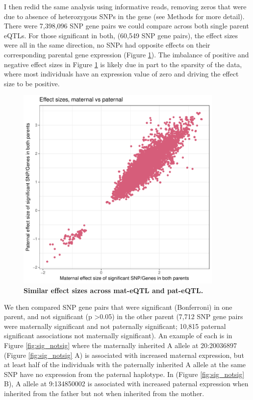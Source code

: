 I then redid the same analysis using informative reads, removing zeros that were due to absence of heterozygous SNPs in the gene (see Methods for more detail). There were 7,398,096 SNP gene pairs we could compare across both single parent eQTLs. For those significant in both, (60,549 SNP gene pairs), the effect sizes were all in the same direction, no SNPs had opposite effects on their corresponding parental gene expression (Figure \ref{fig:effectsizes}). The imbalance of positive and negative effect sizes in Figure \ref{fig:effectsizes} is likely due in part to the sparsity of the data, where most individuals have an expression value of zero and driving the effect size to be positive.

\begin{figure}[!htb]
\centering \includegraphics[width=4in]{img/ch04/fig-06-effectsizes.pdf}
\caption[Similar effect sizes across mat-eQTL and pat-eQTL.]{\textbf{Similar effect sizes across mat-eQTL and pat-eQTL.} }
\label{fig:effectsizes}
\end{figure}


We then compared SNP gene pairs that were significant (Bonferroni) in one parent, and not significant (p \textgreater 0.05) in the other parent (7,712 SNP gene pairs were maternally significant and not paternally significant; 10,815 paternal significant associations not maternally significant). An example of each is in Figure \ref{fig:sig_notsig} where the maternally inherited A allele at 20:20036897 (Figure \ref{fig:sig_notsig} A) is associated with increased maternal expression, but at least half of the individuals with the paternally inherited A allele at the same SNP have no expression from the paternal haplotype. In (Figure \ref{fig:sig_notsig} B), A allele at 9:134850002 is associated with increased paternal expression when inherited from the father but not when inherited from the mother.


